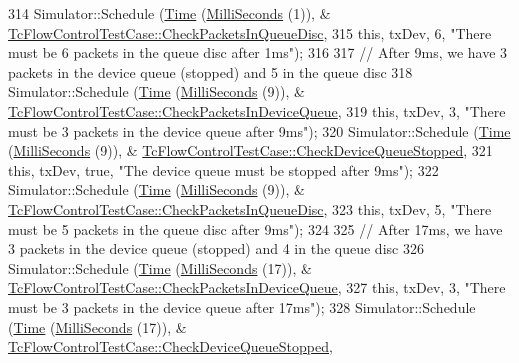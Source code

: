 \begin{DoxyCode}
314       Simulator::Schedule (\hyperlink{classns3_1_1Time}{Time} (\hyperlink{group__timecivil_gaf26127cf4571146b83a92ee18679c7a9}{MilliSeconds} (1)), &
      \hyperlink{classTcFlowControlTestCase_ac6d0b6a74dd29a21369bf1d26795098d}{TcFlowControlTestCase::CheckPacketsInQueueDisc},
315                           \textcolor{keyword}{this}, txDev, 6, \textcolor{stringliteral}{"There must be 6 packets in the queue disc after 1ms"});
316 
317       \textcolor{comment}{// After 9ms, we have 3 packets in the device queue (stopped) and 5 in the queue disc}
318       Simulator::Schedule (\hyperlink{classns3_1_1Time}{Time} (\hyperlink{group__timecivil_gaf26127cf4571146b83a92ee18679c7a9}{MilliSeconds} (9)), &
      \hyperlink{classTcFlowControlTestCase_a7ad467b39fdb155daea4b048619f6d12}{TcFlowControlTestCase::CheckPacketsInDeviceQueue},
319                           \textcolor{keyword}{this}, txDev, 3, \textcolor{stringliteral}{"There must be 3 packets in the device queue after 9ms"});
320       Simulator::Schedule (\hyperlink{classns3_1_1Time}{Time} (\hyperlink{group__timecivil_gaf26127cf4571146b83a92ee18679c7a9}{MilliSeconds} (9)), &
      \hyperlink{classTcFlowControlTestCase_a4ccc9564c9142984fa8041f67b4a518a}{TcFlowControlTestCase::CheckDeviceQueueStopped},
321                           \textcolor{keyword}{this}, txDev, \textcolor{keyword}{true}, \textcolor{stringliteral}{"The device queue must be stopped after 9ms"});
322       Simulator::Schedule (\hyperlink{classns3_1_1Time}{Time} (\hyperlink{group__timecivil_gaf26127cf4571146b83a92ee18679c7a9}{MilliSeconds} (9)), &
      \hyperlink{classTcFlowControlTestCase_ac6d0b6a74dd29a21369bf1d26795098d}{TcFlowControlTestCase::CheckPacketsInQueueDisc},
323                           \textcolor{keyword}{this}, txDev, 5, \textcolor{stringliteral}{"There must be 5 packets in the queue disc after 9ms"});
324 
325       \textcolor{comment}{// After 17ms, we have 3 packets in the device queue (stopped) and 4 in the queue disc}
326       Simulator::Schedule (\hyperlink{classns3_1_1Time}{Time} (\hyperlink{group__timecivil_gaf26127cf4571146b83a92ee18679c7a9}{MilliSeconds} (17)), &
      \hyperlink{classTcFlowControlTestCase_a7ad467b39fdb155daea4b048619f6d12}{TcFlowControlTestCase::CheckPacketsInDeviceQueue},
327                           \textcolor{keyword}{this}, txDev, 3, \textcolor{stringliteral}{"There must be 3 packets in the device queue after 17ms"});
328       Simulator::Schedule (\hyperlink{classns3_1_1Time}{Time} (\hyperlink{group__timecivil_gaf26127cf4571146b83a92ee18679c7a9}{MilliSeconds} (17)), &
      \hyperlink{classTcFlowControlTestCase_a4ccc9564c9142984fa8041f67b4a518a}{TcFlowControlTestCase::CheckDeviceQueueStopped},

\end{DoxyCode}
